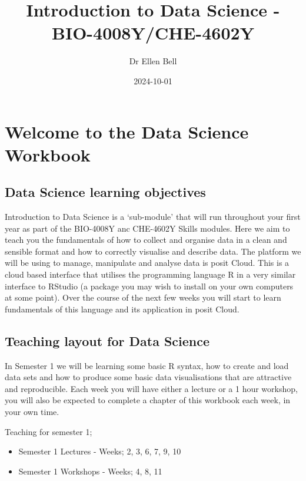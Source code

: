 \documentclass[
]{book}
\title{Introduction to Data Science - BIO-4008Y/CHE-4602Y}
\author{Dr Ellen Bell}
\date{2024-10-01}
\providecommand{\tightlist}{%
  \setlength{\itemsep}{0pt}\setlength{\parskip}{0pt}}
\begin{document}
\maketitle

{
\setcounter{tocdepth}{1}
\tableofcontents
}
\hypertarget{welcome-to-the-data-science-workbook}{%
\chapter{Welcome to the Data Science Workbook}\label{welcome-to-the-data-science-workbook}}

\hypertarget{data-science-learning-objectives}{%
\section{Data Science learning objectives}\label{data-science-learning-objectives}}

Introduction to Data Science is a `sub-module' that will run throughout your first year as part of the BIO-4008Y anc CHE-4602Y Skills modules. Here we aim to teach you the fundamentals of how to collect and organise data in a clean and sensible format and how to correctly visualise and describe data. The platform we will be using to manage, manipulate and analyse data is posit Cloud. This is a cloud based interface that utilises the programming language R in a very similar interface to RStudio (a package you may wish to install on your own computers at some point). Over the course of the next few weeks you will start to learn fundamentals of this language and its application in posit Cloud.

\hypertarget{teaching-layout-for-data-science}{%
\section{Teaching layout for Data Science}\label{teaching-layout-for-data-science}}

In Semester 1 we will be learning some basic R syntax, how to create and load data sets and how to produce some basic data visualisations that are attractive and reproducible. Each week you will have either a lecture or a 1 hour workshop, you will also be expected to complete a chapter of this workbook each week, in your own time.

Teaching for semester 1;

\begin{itemize}
\tightlist
\item
  Semester 1 Lectures - Weeks; 2, 3, 6, 7, 9, 10
\item
  Semester 1 Workshops - Weeks; 4, 8, 11
\end{itemize}
\end{document}
